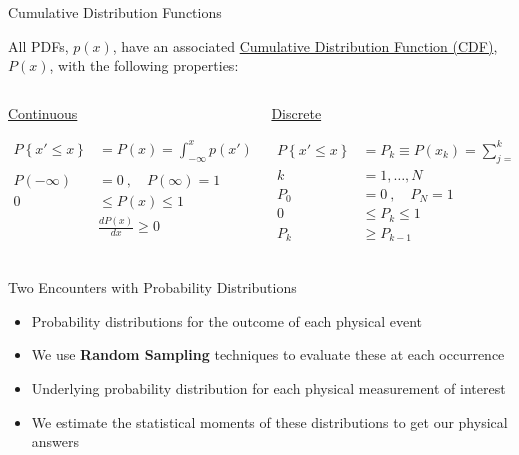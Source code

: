 \documentclass[xcolor=x11names,compress]{beamer}
\renewcommand{\(}{\begin{columns}}
\renewcommand{\)}{\end{columns}}
\newcommand{\<}[1]{\begin{column}{#1}}
\renewcommand{\>}{\end{column}}
\begin{document}
\begin{frame}{Cumulative Distribution Functions}

All PDFs, $p(x)$, have an associated \underline{Cumulative Distribution Function (CDF)}, $P(x)$, with the following properties:

\begin{columns}
  \begin{column}{0.5\textwidth}
    \begin{center}
    \textcolor{berkeleygold}{\underline{Continuous}} 
    \end{center}
    \begin{align*}
    P\left\lbrace x' \leq x \right\rbrace &= P(x) = \int_{-\infty}^x p(x')dx'\\
    & \\
    P(-\infty) &= 0 \:,\quad P(\infty) = 1 \\
    0 &\leq P(x) \leq 1 \\
    &\frac{dP(x)}{dx} \geq 0
    \end{align*}
  \end{column}
  \begin{column}{0.5\textwidth}
    \begin{center}
    \textcolor{berkeleyblue}{\underline{Discrete}}  
    \end{center}
    \begin{align*}
    P\left\lbrace x' \leq x \right\rbrace &= P_k \equiv P(x_k) = \sum_{j=1}^k p_j\\
    k &= 1, \dots, N \\
    P_0 &= 0 \:,\quad P_N = 1 \\
    0 &\leq P_k \leq 1 \\
    P_k & \geq P_{k-1} \\
    \end{align*}
  \end{column}
\end{columns}

\end{frame}


\begin{frame}{Two Encounters with Probability Distributions}

\begin{itemize}
    \item Probability distributions for the outcome
of each physical event
    \item We use \textbf{Random Sampling} techniques to
evaluate these at each occurrence
    \item Underlying probability distribution for
each physical measurement of interest
    \item We estimate the statistical moments of
these distributions to get our physical
answers
\end{itemize}
\end{frame}
\end{document}
